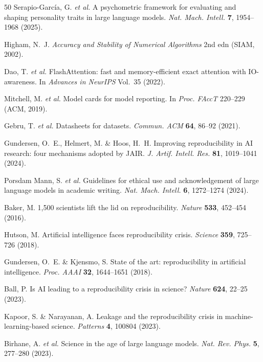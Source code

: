 \documentclass[sn-nature]{sn-jnl}
\begin{document}
\begin{thebibliography}{50}
Serapio-Garc\'{i}a, G. \emph{et al.}
A psychometric framework for evaluating and shaping personality traits in large language models.
\emph{Nat. Mach. Intell.} \textbf{7}, 1954--1968 (2025).

Higham, N.~J.
\emph{Accuracy and Stability of Numerical Algorithms} 2nd edn (SIAM, 2002).

Dao, T. \emph{et al.}
FlashAttention: fast and memory-efficient exact attention with IO-awareness.
In \emph{Advances in NeurIPS} Vol.~35 (2022).

Mitchell, M. \emph{et al.}
Model cards for model reporting.
In \emph{Proc. FAccT} 220--229 (ACM, 2019).

Gebru, T. \emph{et al.}
Datasheets for datasets.
\emph{Commun. ACM} \textbf{64}, 86--92 (2021).

Gundersen, O.~E., Helmert, M. \& Hoos, H.~H.
Improving reproducibility in AI research: four mechanisms adopted by JAIR.
\emph{J. Artif. Intell. Res.} \textbf{81}, 1019--1041 (2024).

Porsdam Mann, S. \emph{et al.}
Guidelines for ethical use and acknowledgement of large language models in academic writing.
\emph{Nat. Mach. Intell.} \textbf{6}, 1272--1274 (2024).

Baker, M.
1,500 scientists lift the lid on reproducibility.
\emph{Nature} \textbf{533}, 452--454 (2016).

Hutson, M.
Artificial intelligence faces reproducibility crisis.
\emph{Science} \textbf{359}, 725--726 (2018).

Gundersen, O.~E. \& Kjensmo, S.
State of the art: reproducibility in artificial intelligence.
\emph{Proc. AAAI} \textbf{32}, 1644--1651 (2018).

Ball, P.
Is AI leading to a reproducibility crisis in science?
\emph{Nature} \textbf{624}, 22--25 (2023).

Kapoor, S. \& Narayanan, A.
Leakage and the reproducibility crisis in machine-learning-based science.
\emph{Patterns} \textbf{4}, 100804 (2023).

Birhane, A. \emph{et al.}
Science in the age of large language models.
\emph{Nat. Rev. Phys.} \textbf{5}, 277--280 (2023).


\end{thebibliography}
\end{document}
